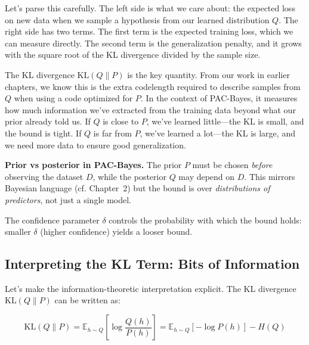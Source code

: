 \vspace{0.3cm}

Let's parse this carefully. The left side is what we care about: the expected loss on new data when we sample a hypothesis from our learned distribution $Q$. The right side has two terms. The first term is the expected training loss, which we can measure directly. The second term is the generalization penalty, and it grows with the square root of the KL divergence divided by the sample size.

\vspace{0.3cm}

The KL divergence $\text{KL}(Q \| P)$ is the key quantity. From our work in earlier chapters, we know this is the extra codelength required to describe samples from $Q$ when using a code optimized for $P$. In the context of PAC-Bayes, it measures how much information we've extracted from the training data beyond what our prior already told us. If $Q$ is close to $P$, we've learned little---the KL is small, and the bound is tight. If $Q$ is far from $P$, we've learned a lot---the KL is large, and we need more data to ensure good generalization.

\vspace{1em}


\vspace{0.3cm}
\begin{keyinsight}
\textbf{Prior vs posterior in PAC\mbox{-}Bayes.} The prior $P$ must be chosen \emph{before} observing the dataset $D$, while the posterior $Q$ may depend on $D$. This mirrors Bayesian language (cf. Chapter~2) but the bound is over \emph{distributions of predictors}, not just a single model.
\end{keyinsight}

\vspace{0.3cm}
The confidence parameter $\delta$ controls the probability with which the bound holds: smaller $\delta$ (higher confidence) yields a looser bound.
\subsection{Interpreting the KL Term: Bits of Information}

Let's make the information-theoretic interpretation explicit. The KL divergence $\text{KL}(Q \| P)$ can be written as:

\vspace{0.3cm}

\begin{equation}
\text{KL}(Q \| P) = \mathbb{E}_{h \sim Q}\left[\log \frac{Q(h)}{P(h)}\right] = \mathbb{E}_{h \sim Q}[-\log P(h)] - H(Q)
\end{equation}

